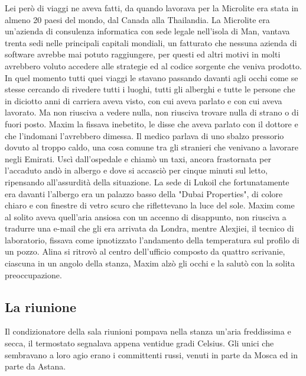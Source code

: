 Lei però di viaggi ne aveva fatti, da quando lavorava per la Microlite era stata in almeno 20 paesi del mondo, dal Canada alla Thailandia. La Microlite era un'azienda di consulenza informatica con sede legale nell'isola di Man, vantava trenta sedi nelle principali capitali mondiali, un fatturato che nessuna azienda di software avrebbe mai potuto raggiungere, per questi ed altri motivi in molti avrebbero voluto accedere alle strategie ed al codice sorgente che veniva prodotto.\newline
In quel momento tutti quei viaggi le stavano passando davanti agli occhi come se stesse cercando di rivedere tutti i luoghi, tutti gli alberghi e tutte le persone che in diciotto anni di carriera aveva visto, con cui aveva parlato e con cui aveva lavorato. Ma non riusciva a vedere nulla, non riusciva trovare nulla di strano o di fuori posto. Maxim la fissava inebetito, le disse che aveva parlato con il dottore e che l'indomani l'avrebbero dimessa. Il medico parlava di uno sbalzo pressorio dovuto al troppo caldo, una cosa comune tra gli stranieri che venivano a lavorare negli Emirati.\newline
Uscì dall'ospedale e chiamò un taxi, ancora frastornata per l'accaduto andò in albergo e dove si accasciò per cinque minuti sul letto, ripensando all'assurdità della situazione. La sede di Lukoil che fortunatamente era davanti l'albergo era un palazzo basso della "Dubai Properties", di colore chiaro e con finestre di vetro scuro che riflettevano la luce del sole. Maxim come al solito aveva quell'aria ansiosa con un accenno di disappunto, non riusciva a tradurre una e-mail che gli era arrivata da Londra, mentre Alexjiei, il tecnico di laboratorio, fissava come ipnotizzato l'andamento della temperatura sul profilo di un pozzo.\newline
Alina si ritrovò al centro dell'ufficio composto da quattro scrivanie, ciascuna in un angolo della stanza, Maxim alzò gli occhi e la salutò con la solita preoccupazione.
\scenechange
\subsection*{La riunione}
Il condizionatore della sala riunioni pompava nella stanza un'aria freddissima e secca, il termostato segnalava appena ventidue gradi Celsius. Gli unici che sembravano a loro agio erano i committenti russi, venuti in parte da Mosca ed in parte da Astana.
